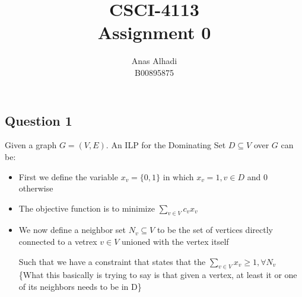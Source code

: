 \documentclass{article}
\title{\textbf{CSCI-4113\\Assignment 0}}
\author{Anas Alhadi\\B00895875}
\numberwithin{equation}{subsection}
\begin{document}
	\maketitle
	\tableofcontents

	\newpage
	\subsection{Question 1}
	\par{Given a graph $G=(V,E)$. An ILP for the Dominating Set $D\subseteq V$ over $G$ can be:}
	
	\begin{itemize}
		\item 	\par{First we define the variable $x_v = \{0,1\}$ in which $x_v = 1, v\in D$ and $0$ otherwise}
		\item 	\par{The objective function is to minimize $\sum_{v\in V}c_vx_v$}
		\item 	\par{We now define a neighbor set $N_v\subseteq V$ to be the set of vertices directly connected to a vetrex $v\in V$ unioned with the vertex itself}
			\par{Such that we have a constraint that states that the $\sum_{v\in V}x_v \ge 1, \forall N_v$\\\{What this basically
			is trying to say is that given a vertex, at least it or one of its neighbors needs to be in D\}}
	\end{itemize}

   
\end{document}
